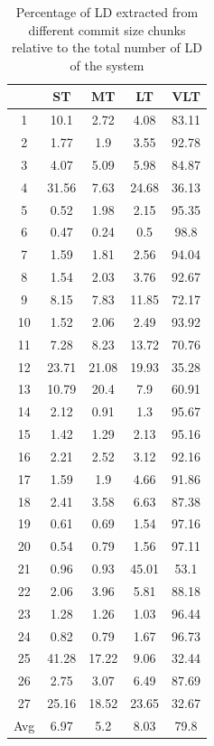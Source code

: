 \documentclass[a4paper,twoside]{article}
\begin{document}
\begin{table}[!h]
\renewcommand{\arraystretch}{1.25}
\caption{Percentage of LD extracted from different commit size chunks relative to the total number of LD of the system }
\label{table:6}
\centering
\begin{tabular}{|c|c|c|c|c|}
\hline
   &	ST	&	MT	&	LT	&	VLT	\\
\hline
1	&	10.1	&	2.72	&	4.08	&	83.11	\\
2	&	1.77	&	1.9	&	3.55	&	92.78	\\
3	&	4.07	&	5.09	&	5.98	&	84.87	\\
4	&	31.56	&	7.63	&	24.68	&	36.13	\\
5	&	0.52	&	1.98	&	2.15	&	95.35	\\
6	&	0.47	&	0.24	&	0.5	&	98.8	\\
7	&	1.59	&	1.81	&	2.56	&	94.04	\\
8	&	1.54	&	2.03	&	3.76	&	92.67	\\
9	&	8.15	&	7.83	&	11.85	&	72.17	\\
10	&	1.52	&	2.06	&	2.49	&	93.92	\\
11	&	7.28	&	8.23	&	13.72	&	70.76	\\
12	&	23.71	&	21.08	&	19.93	&	35.28	\\
13	&	10.79	&	20.4	&	7.9	&	60.91	\\
14	&	2.12	&	0.91	&	1.3	&	95.67	\\
15	&	1.42	&	1.29	&	2.13	&	95.16	\\
16	&	2.21	&	2.52	&	3.12	&	92.16	\\
17	&	1.59	&	1.9	&	4.66	&	91.86	\\
18	&	2.41	&	3.58	&	6.63	&	87.38	\\
19	&	0.61	&	0.69	&	1.54	&	97.16	\\
20	&	0.54	&	0.79	&	1.56	&	97.11	\\
21	&	0.96	&	0.93	&	45.01	&	53.1	\\
22	&	2.06	&	3.96	&	5.81	&	88.18	\\
23	&	1.28	&	1.26	&	1.03	&	96.44	\\
24	&	0.82	&	0.79	&	1.67	&	96.73	\\
25	&	41.28	&	17.22	&	9.06	&	32.44	\\
26	&	2.75	&	3.07	&	6.49	&	87.69	\\
27	&	25.16	&	18.52	&	23.65	&	32.67	\\

\hline
Avg	&	6.97	&	5.2	&	8.03	&	79.8	\\
\hline
\end{tabular}
\end{table}
\end{document}

